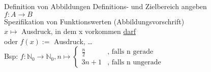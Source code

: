 \begin{frame}{Definition von Abbildungen}
	Definitions- und Zielbereich angeben\\
	$f: A\longrightarrow B$\\
	Spezifikation von Funktionswerten (Abbildungsvorschrift)\\
	$x\mapsto$ Ausdruck, in dem x vorkommen \underline{darf}\\
	oder $f(x) :=$ Ausdruck, \dots\\
	Bsp: $f: \mathbb{N}_0\longrightarrow\mathbb{N}_0, n\mapsto
		\begin{cases}
			\frac{n}{2} & \text{, falls n gerade}   \\
			3n+1        & \text{, falls n ungerade}
		\end{cases}$
\end{frame}


